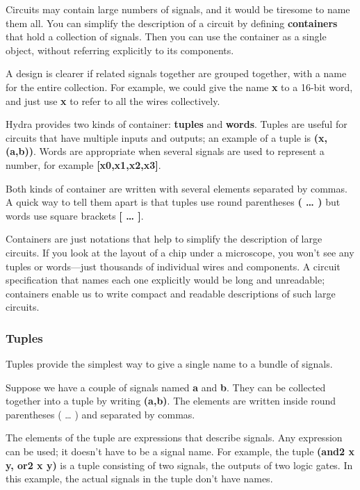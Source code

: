 \documentclass[11pt]{article}
\begin{document}
Circuits may contain large numbers of signals, and it would be
tiresome to name them all.  You can simplify the description of a
circuit by defining \textbf{containers} that hold a collection of signals.
Then you can use the container as a single object, without referring
explicitly to its components.

A design is clearer if related signals together are grouped together,
with a name for the entire collection.  For example, we could give the
name \textbf{x} to a 16-bit word, and just use \textbf{x} to refer to all the wires
collectively.

Hydra provides two kinds of container: \textbf{tuples} and \textbf{words}.
Tuples are useful for circuits that have multiple inputs and outputs;
an example of a tuple is \textbf{(x, (a,b))}.  Words are appropriate when
several signals are used to represent a number, for example
\textbf{[x0,x1,x2,x3]}.

Both kinds of container are written with several elements separated by
commas.  A quick way to tell them apart is that tuples use round
parentheses \textbf{( \ldots{}  )} but words use square brackets \textbf{[ \ldots{}  ]}.

Containers are just notations that help to simplify the description of
large circuits.  If you look at the layout of a chip under a
microscope, you won't see any tuples or words---just thousands of
individual wires and components.  A circuit specification that names
each one explicitly would be long and unreadable; containers enable us
to write compact and readable descriptions of such large circuits.

\subsubsection{Tuples}
\label{sec:org45de93c}

Tuples provide the simplest way to give a single name to a bundle of
signals.

Suppose we have a couple of signals named \textbf{a} and \textbf{b}.  They can be
collected together into a tuple by writing \textbf{(a,b)}.  The elements are
written inside round parentheses ( \ldots{} ) and separated by commas.

The elements of the tuple are expressions that describe signals.  Any
expression can be used; it doesn't have to be a signal name.  For
example, the tuple \textbf{(and2 x y, or2 x y)} is a tuple consisting of two
signals, the outputs of two logic gates.  In this example, the actual
signals in the tuple don't have names.
\end{document}
